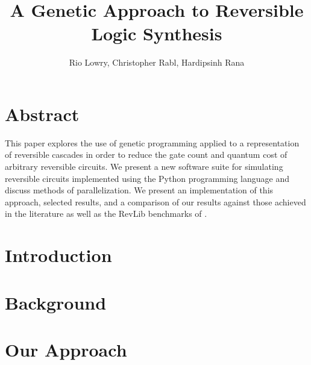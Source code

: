 \documentclass[12pt]{article}
\title{A Genetic Approach to Reversible Logic Synthesis}
\author{Rio Lowry, Christopher Rabl, Hardipsinh Rana}
\date{}
\begin{document}
\maketitle

\section*{Abstract}


This paper explores the use of genetic programming applied to a representation of reversible cascades in order to reduce the gate count and quantum cost of arbitrary reversible circuits. We present a new software suite for simulating reversible circuits implemented using the Python programming language and discuss methods of parallelization. We present an implementation of this approach, selected results, and a comparison of our results against those achieved in the literature as well as the RevLib benchmarks of \cite{RevLib}.

\begingroup
\let\clearpage\relax
\section{Introduction}



\section{Background}










\section{Our Approach}







\endgroup

\pagebreak


\end{document}
